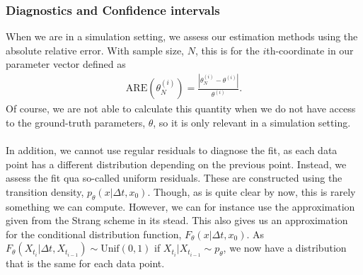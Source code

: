\subsubsection{Diagnostics and Confidence intervals}
When we are in a simulation setting, we assess our estimation methods using the absolute relative error. With sample size, $N$, this is for the $i$th-coordinate in our parameter vector defined as
\begin{align}
    \mathrm{ARE}\left(\theta_N^{(i)}\right) = \frac{\left|\theta_N^{(i)} - \theta^{(i)}\right|}{\theta^{(i)}}. \label{eq:ARE}
\end{align}
Of course, we are not able to calculate this quantity when we do not have access to the ground-truth parameters, $\theta$, so it is only relevant in a simulation setting.\\\\
In addition, we cannot use regular residuals to diagnose the fit, as each data point has a different distribution depending on the previous point. Instead, we assess the fit qua so-called uniform residuals. These are constructed using the transition density, $p_\theta(x|\Delta t, x_0)$. Though, as is quite clear by now, this is rarely something we can compute. However, we can for instance use the approximation given from the Strang scheme in its stead. This also gives us an approximation for the conditional distribution function, $F_\theta(x|\Delta t, x_0)$. As $F_\theta(X_{t_{i}}|\Delta t, X_{t_{i - 1}})\sim \mathrm{Unif}(0,1)$ if $X_{t_{i}}|X_{t_{i - 1}} \sim p_\theta$, we now have a distribution that is the same for each data point.

